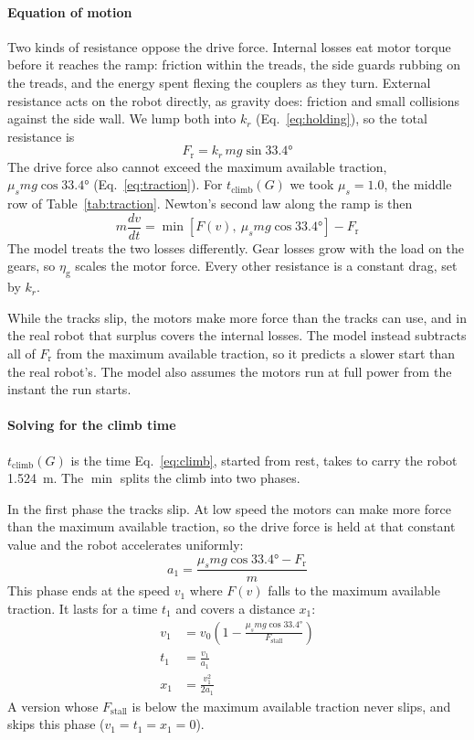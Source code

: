 \paragraph{Equation of motion}
Two kinds of resistance oppose the drive force. Internal losses eat motor torque before it reaches the ramp: friction within the treads, the side guards rubbing on the treads, and the energy spent flexing the couplers as they turn. External resistance acts on the robot directly, as gravity does: friction and small collisions against the side wall. We lump both into $k_r$ (Eq.~\eqref{eq:holding}), so the total resistance is
\begin{equation}
  F_\mathrm{r} = k_r\, m g \sin\ang{33.4}
  \label{eq:W}
\end{equation}
The drive force also cannot exceed the maximum available traction, $\mu_s m g \cos\ang{33.4}$ (Eq.~\eqref{eq:traction}). For $t_\mathrm{climb}(G)$ we took $\mu_s = 1.0$, the middle row of Table~\ref{tab:traction}. Newton's second law along the ramp is then
\begin{equation}
  m \frac{dv}{dt} = \min\!\left[F(v),\ \mu_s m g \cos\ang{33.4}\right] - F_\mathrm{r}
  \label{eq:climb}
\end{equation}
The model treats the two losses differently. Gear losses grow with the load on the gears, so $\eta_\mathrm{g}$ scales the motor force. Every other resistance is a constant drag, set by $k_r$.

While the tracks slip, the motors make more force than the tracks can use, and in the real robot that surplus covers the internal losses. The model instead subtracts all of $F_\mathrm{r}$ from the maximum available traction, so it predicts a slower start than the real robot's. The model also assumes the motors run at full power from the instant the run starts.

\paragraph{Solving for the climb time}
$t_\mathrm{climb}(G)$ is the time Eq.~\eqref{eq:climb}, started from rest, takes to carry the robot \qty{1.524}{m}. The $\min$ splits the climb into two phases.

In the first phase the tracks slip. At low speed the motors can make more force than the maximum available traction, so the drive force is held at that constant value and the robot accelerates uniformly:
\begin{equation}
  a_1 = \frac{\mu_s m g \cos\ang{33.4} - F_\mathrm{r}}{m}
  \label{eq:a1}
\end{equation}
This phase ends at the speed $v_1$ where $F(v)$ falls to the maximum available traction. It lasts for a time $t_1$ and covers a distance $x_1$:
\begin{align}
  v_1 &= v_0\left(1 - \frac{\mu_s m g \cos\ang{33.4}}{F_\mathrm{stall}}\right) \label{eq:v1} \\
  t_1 &= \frac{v_1}{a_1} \label{eq:t1} \\
  x_1 &= \frac{v_1^2}{2 a_1} \label{eq:x1}
\end{align}
A version whose $F_\mathrm{stall}$ is below the maximum available traction never slips, and skips this phase ($v_1 = t_1 = x_1 = 0$).

